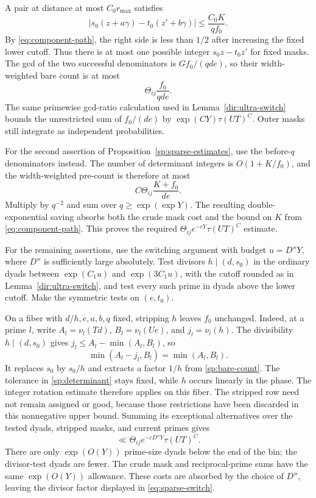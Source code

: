 A pair at distance at most $C_0r_{\max}$ satisfies
\begin{equation}\label{sp:determinant}
 \left|s_0(z+a\gamma)-t_0(z'+b\gamma)\right|
 \le \frac{C_0K}{qf_0}.
\end{equation}
By \eqref{eq:component-path}, the right side is less than $1/2$ after
increasing the fixed lower cutoff.  Thus there is at most one possible
integer $s_0z-t_0z'$ for fixed masks.  The gcd of the two successful
denominators is $Gf_0/(qde)$, so their width-weighted bare count is at most
\begin{equation}\label{sp:bare-count}
 \Theta_{ij}\frac{f_0}{qde}.
\end{equation}
The same primewise gcd-ratio calculation used in
Lemma~\ref{dir:ultra-switch} bounds the unrestricted sum of $f_0/(de)$
by $\exp(CY)\tau(UT)^C$.  Outer masks still integrate as independent
probabilities.

For the second assertion of Proposition~\ref{sp:sparse-estimates}, use the
before-$q$ denominators instead.  The number of determinant integers is
$O(1+K/f_0)$, and the width-weighted pre-count is therefore at most
\[
 C\Theta_{ij}\frac{K+f_0}{de}.
\]
Multiply by $q^{-2}$ and sum over $q\ge\exp(\exp Y)$.  The resulting
double-exponential saving absorbs both the crude mask cost and the bound
on $K$ from \eqref{eq:component-path}.  This proves the required
$\Theta_{ij}e^{-cY}\tau(UT)^C$ estimate.

For the remaining assertions, use the switching argument with budget
$u=D''Y$, where $D''$ is sufficiently large absolutely.  Test divisors
$h\mid(d,s_0)$ in the ordinary dyads between
$\exp(C_1u)$ and $\exp(3C_1u)$, with the cutoff rounded as in
Lemma~\ref{dir:ultra-switch}, and test every such prime in dyads above the
lower cutoff.  Make the symmetric tests on $(e,t_0)$.

On a fiber with $d/h,e,a,b,q$ fixed, stripping $h$ leaves $f_0$ unchanged.
Indeed, at a prime $l$, write $A_l=\nu_l(Td)$, $B_l=\nu_l(Ue)$,
and $j_l=\nu_l(h)$.  The divisibility $h\mid(d,s_0)$ gives
$j_l\le A_l-\min(A_l,B_l)$, so
\[
 \min(A_l-j_l,B_l)=\min(A_l,B_l).
\]
It replaces $s_0$ by $s_0/h$ and extracts a factor
$1/h$ from \eqref{sp:bare-count}.  The tolerance in
\eqref{sp:determinant} stays fixed, while $h$ occurs linearly in the
phase.  The integer rotation estimate therefore applies on this fiber.
The stripped row need not remain assigned or good, because those
restrictions have been discarded in this nonnegative upper bound.
Summing its exceptional alternatives over the tested dyads, stripped
masks, and current primes gives
\begin{equation}\label{eq:sparse-switch}
 \ll \Theta_{ij}e^{-cD''Y}\tau(UT)^C.
\end{equation}
There are only $\exp(O(Y))$ prime-size dyads below the end of the bin;
the divisor-test dyads are fewer.  The crude mask and reciprocal-prime
sums have the same $\exp(O(Y))$ allowance.  These costs are absorbed by
the choice of $D''$, leaving the divisor factor displayed in
\eqref{eq:sparse-switch}.

